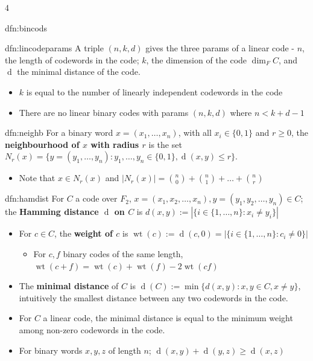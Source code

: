 \documentclass[landscape, 8pt]{extarticle}
\DeclareMathOperator{\wt}{wt}
\DeclareMathOperator{\dd}{d}
\begin{document}
\begin{multicols*}{4}
\begin{mdfn}{dfn:bincods}{ }
		\end{mdfn}
		
		
		\begin{dfn}{dfn:lincodeparams}{ }
		A triple $(n, k, d)$ gives the three params of a linear code - $n$, the length of codewords in the code; $k$, the dimension of the code $\dim_F C$, and $\dd$ the minimal distance of the code.
		\begin{itemize}
			\item $k$ is equal to the number of linearly independent codewords in the code
			\item There are no linear binary codes with params $(n, k, d)$ where $n < k+d-1$
		\end{itemize}
		
		\end{dfn}
		
		
		\begin{dfn}{dfn:neighb}{ }
		For a binary word $x = (x_1, \dots, x_n)$, with all $x_i\in \{0, 1\}$ and $r \ge 0$, the \textbf{neighbourhood of $x$ with radius $r$} is the set $N_r(x) = \{y = (y_1, \dots, y_n) : y_1, \dots, y_n\in \{0, 1\}, \dd(x, y) \le r\}$.
		\begin{itemize}
			\item Note that $x\in N_r(x)$ and $\left|N_r(x)\right| = \binom{n}{0} + \binom{n}{1} + \dotsc + \binom{n}{r}$ 
		\end{itemize}
		
		\end{dfn}
		
		
		\begin{dfn}{dfn:hamdist}{ }
		For $C$ a code over $F_2$, $x = (x_1, x_2, \dots, x_n), y = (y_1, y_2, \dots, y_n)\in C$; the \textbf{Hamming distance $\dd$ on $C$} is $d(x, y) := \left|\{i\in \{1, \dots, n\} : x_i \ne y_i\}\right|$
		\begin{itemize}
			\item For $c\in C$, the \textbf{weight of $c$} is $\wt(c) := \dd(c, 0) = \left|\{i\in \{1, \dots, n\} : c_i \ne 0\}\right|$
			\begin{itemize}
				\item For $c, f$ binary codes of the same length, $\wt(c + f) = \wt(c) + \wt(f) - 2\wt(cf)$
			\end{itemize}
			\item The \textbf{minimal distance} of $C$ is $\dd(C) := \min\{d(x, y) : x, y\in C, x \ne y\}$, intuitively the smallest distance between any two codewords in the code.
			\item For $C$ a linear code, the minimal distance is equal to the minimum weight among non-zero codewords in the code.
			\item For binary words $x, y, z$ of length $n$; $\dd(x, y) + \dd(y,z) \ge \dd(x, z)$
		\end{itemize}
		

\end{dfn}
\end{multicols*}
\end{document}
